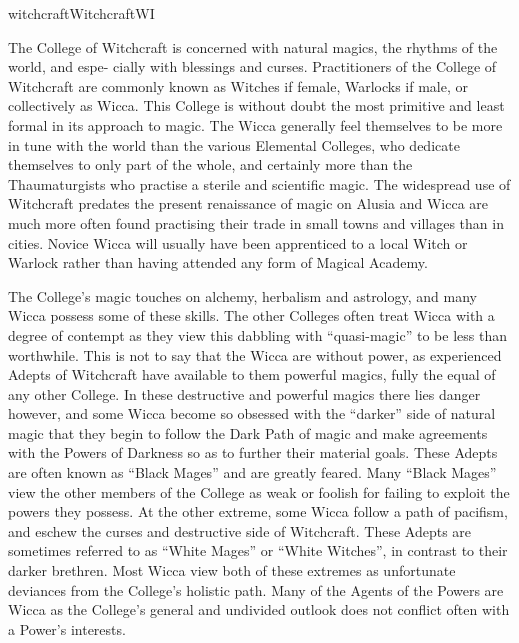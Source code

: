 \begin{College}[1.1]{witchcraft}{Witchcraft}{WI}

The College of Witchcraft is concerned with natural magics, the
rhythms of the world, and espe- cially with blessings and curses.
Practitioners of the College of Witchcraft are commonly known as
Witches if female, Warlocks if male, or collectively as Wicca. This
College is without doubt the most primitive and least formal in its
approach to magic.  The Wicca generally feel themselves to be more in
tune with the world than the various Elemental Colleges, who dedicate
themselves to only part of the whole, and certainly more than the
Thaumaturgists who practise a sterile and scientific magic.  The
widespread use of Witchcraft predates the present renaissance of magic
on Alusia and Wicca are much more often found practising their trade
in small towns and villages than in cities.  Novice Wicca will usually
have been apprenticed to a local Witch or Warlock rather than having
attended any form of Magical Academy.

The College’s magic touches on alchemy, herbalism and astrology, and
many Wicca possess some of these skills.  The other Colleges often
treat Wicca with a degree of contempt as they view this dabbling with
“quasi-magic” to be less than worthwhile.  This is not to say that the
Wicca are without power, as experienced Adepts of Witchcraft have
available to them powerful magics, fully the equal of any other
College. In these destructive and powerful magics there lies danger
however, and some Wicca become so obsessed with the “darker” side of
natural magic that they begin to follow the Dark Path of magic and
make agreements with the Powers of Darkness so as to further their
material goals. These Adepts are often known as “Black Mages” and are
greatly feared.  Many “Black Mages” view the other members of the
College as weak or foolish for failing to exploit the powers they
possess.  At the other extreme, some Wicca follow a path of pacifism,
and eschew the curses and destructive side of Witchcraft.  These
Adepts are sometimes referred to as “White Mages” or “White Witches”,
in contrast to their darker brethren.  Most Wicca view both of these
extremes as unfortunate deviances from the College’s holistic path.
Many of the Agents of the Powers are Wicca as the College’s general
and undivided outlook does not conflict often with a Power’s
interests.


\end{College}
